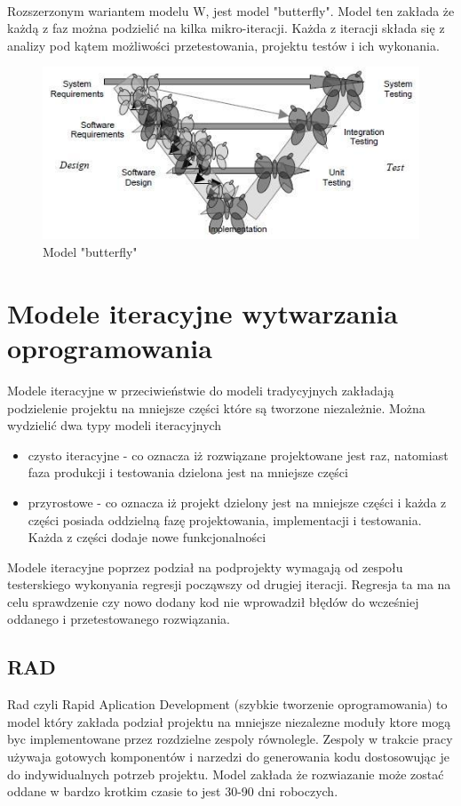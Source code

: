 \paragraph{}
Rozszerzonym wariantem modelu W, jest model "butterfly"\cite{BUTTERFLY}. Model ten zakłada że każdą z faz można podzielić na kilka mikro-iteracji. Każda z iteracji składa się z analizy pod kątem możliwości przetestowania, projektu testów i ich wykonania. 
\begin{figure}[h]
\centerline{\includegraphics[scale=0.5]{img/butterflymodel2.JPG}}
\caption{Model "butterfly" \cite{BUTTERFLY}} 
\label{fig:vmodel}
\end{figure}
\section{Modele iteracyjne wytwarzania oprogramowania}
Modele iteracyjne w przeciwieństwie do modeli tradycyjnych zakładają podzielenie projektu na mniejsze części które są tworzone niezależnie. Można wydzielić dwa typy modeli iteracyjnych
\begin{itemize}
  \item czysto iteracyjne - co oznacza iż rozwiązane projektowane jest raz, natomiast faza produkcji i testowania dzielona jest na mniejsze części
  \item przyrostowe - co oznacza iż projekt dzielony jest na mniejsze części i każda z części posiada oddzielną fazę projektowania, implementacji i testowania. Każda z części dodaje nowe funkcjonalności
 
\end{itemize}
 Modele iteracyjne poprzez podział na podprojekty wymagają od zespołu testerskiego wykonyania regresji począwszy od drugiej iteracji. Regresja ta ma na celu sprawdzenie czy nowo dodany kod nie wprowadził błędów do wcześniej oddanego i przetestowanego rozwiązania.
\subsection{RAD}
Rad czyli Rapid Aplication Development (szybkie tworzenie oprogramowania) to model który zakłada podział projektu na mniejsze
 niezalezne moduły ktore mogą byc implementowane przez rozdzielne zespoly równolegle. Zespoly w trakcie pracy używaja gotowych komponentów i narzedzi do generowania kodu dostosowując je do indywidualnych potrzeb projektu. Model zakłada że rozwiazanie może zostać oddane w bardzo krotkim czasie to jest 30-90 dni roboczych.


